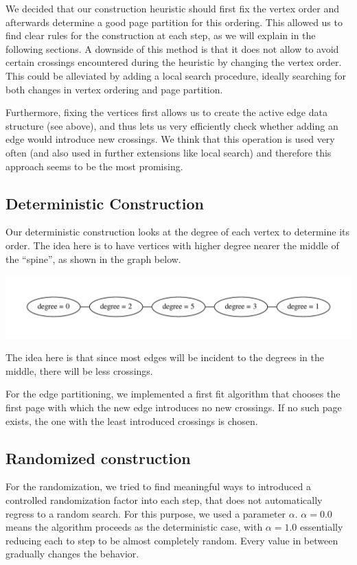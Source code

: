 \documentclass [11pt]{article}
\begin{document}
We decided that our construction heuristic should first fix the vertex order and afterwards determine a good page partition for this ordering. This allowed us to find clear rules for the construction at each step, as we will explain in the following sections. A downside of this method is that it does not allow to avoid certain crossings encountered during the heuristic by changing the vertex order. This could be alleviated by adding a local search procedure, ideally searching for both changes in vertex ordering and page partition. 

Furthermore, fixing the vertices first allows us to create the active edge data structure (see above), and thus lets us very efficiently check whether adding an edge would introduce new crossings. We think that this operation is used very often (and also used in further extensions like local search) and therefore this approach seems to be the most promising.


\subsection{Deterministic Construction}

Our deterministic construction looks at the degree of each vertex to determine its order. The idea here is to have vertices with higher degree nearer the middle of the ``spine'', as shown in the graph below. 
\begin{center}
    \includegraphics[scale=0.6]{bilder/graph.pdf}
\end{center}
The idea here is that since most edges will be incident to the degrees in the middle, there will be less crossings. 

For the edge partitioning, we implemented a first fit algorithm that chooses the first page with which the new edge introduces no new crossings. If no such page exists, the one with the least introduced crossings is chosen. 

\subsection{Randomized construction}
For the randomization, we tried to find meaningful ways to introduced a controlled randomization factor into each step, that does not automatically regress to a random search. For this purpose, we used a parameter $\alpha$. $\alpha = 0.0$  means the algorithm proceeds as the deterministic case, with $\alpha = 1.0$ essentially reducing each to step to be almost completely random. Every value in between gradually changes the behavior. 
\end{document}
